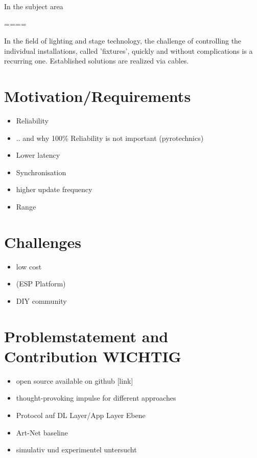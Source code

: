 \documentclass[]{ccs-thesis}
\begin{document}
In the subject area 

====

In the field of lighting and stage technology, the challenge of controlling the individual installations, called 'fixtures', quickly and without complications is a recurring one. 
Established solutions are realized via cables.

\section{Motivation/Requirements}
\begin{itemize}
\item Reliability
\item .. and why 100\% Reliability is not important (pyrotechnics)
\item Lower latency
\item Synchronisation
\item higher update frequency
\item Range
\end{itemize}

\section{Challenges}
\begin{itemize}
\item low cost
\item (ESP Platform)
\item DIY community
\end{itemize}

\section{Problemstatement and Contribution WICHTIG}
\begin{itemize}
\item open source available on github [link]
\item thought-provoking impulse for different approaches
\item Protocol auf DL Layer/App Layer Ebene
\item Art-Net baseline
\item simulativ und experimentel untersucht
\end{itemize}
\end{document}

